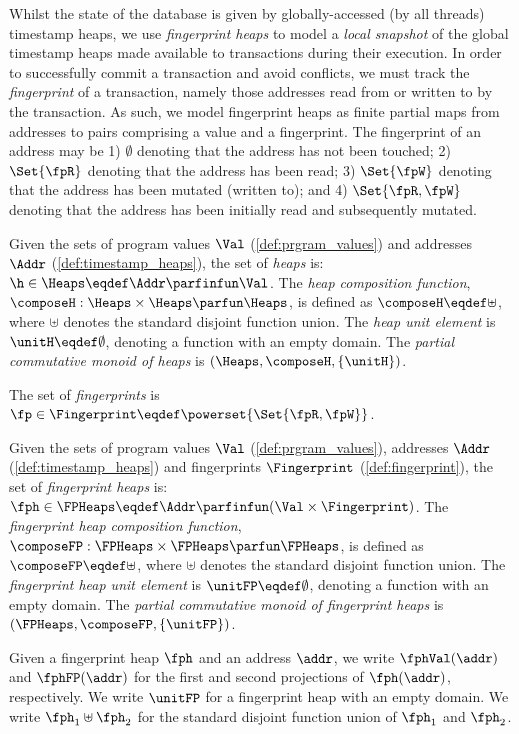Whilst the state of the database is given by globally-accessed (by all threads) timestamp heaps, we use \emph{fingerprint heaps} to model a \emph{local snapshot} of the global timestamp heaps made available to transactions during their execution. 
In order to successfully commit a transaction and avoid conflicts, we must track the \emph{fingerprint} of a transaction, namely those addresses read from or written to by the transaction.
As such, we model fingerprint heaps as finite partial maps from addresses to pairs comprising a value and a fingerprint.
The fingerprint of an address may be 1) $\emptyset$ denoting that the address has not been touched;
2) $\Set{\fpR}$ denoting that the address has been read;
3) $\Set{\fpW}$ denoting that the address has been mutated (written to);
and 4) $\Set{\fpR, \fpW}$ denoting that the address has been initially read and subsequently mutated.   
%
%
\begin{definition}[Heaps]\label{def:heaps}
Given the sets of program values $\Val$ (\ref{def:prgram_values}) and  addresses $\Addr$ (\ref{def:timestamp_heaps}), the set of \emph{ heaps} is: $\h \in \Heaps \eqdef \Addr \parfinfun \Val$.
The \emph{heap composition function}, $\composeH: \Heaps \times \Heaps \parfun \Heaps$, is defined as $\composeH \eqdef \uplus$, where $\uplus$ denotes the standard disjoint function union. The \emph{ heap unit element} is $\unitH \eqdef \emptyset$, denoting a function with an empty domain.
The \emph{partial commutative monoid of  heaps} is $(\Heaps, \composeH, \{\unitH\})$.
\end{definition}
%
\begin{defn}[Fingerprints]
\label{def:fingerprint}
The set of \emph{fingerprints} is $\fp \in \Fingerprint \eqdef \powerset{\Set{\fpR,\fpW}}$.
\end{defn}
%
\begin{defn}
\label{def:fingerprint_heaps}
Given the sets of program values $\Val$ (\ref{def:prgram_values}), addresses $\Addr$ (\ref{def:timestamp_heaps}) and fingerprints $\Fingerprint$ (\ref{def:fingerprint}), the set of \emph{fingerprint heaps} is: $\fph \in \FPHeaps \eqdef \Addr \parfinfun (\Val \times \Fingerprint)$.
The \emph{fingerprint heap composition function}, $\composeFP: \FPHeaps \times \FPHeaps \parfun \FPHeaps$, is defined as $\composeFP \eqdef \uplus$, where $\uplus$ denotes the standard disjoint function union. The \emph{fingerprint heap unit element} is $\unitFP \eqdef \emptyset$, denoting a function with an empty domain.
The \emph{partial commutative monoid of fingerprint heaps} is $(\FPHeaps, \composeFP, \{\unitFP\})$.  
\end{defn}
%
Given a fingerprint heap $\fph$ and an address $\addr$, we write $\fphVal(\addr)$ and $\fphFP(\addr)$ for the first and second projections of $\fph(\addr)$, respectively. We write $\unitFP$ for a fingerprint heap with an empty domain. We write $\fph_1 \uplus \fph_2$ for the standard disjoint function union of $\fph_1$ and $\fph_2$. 

